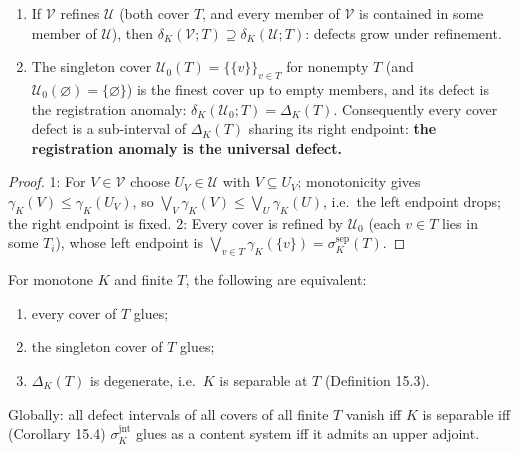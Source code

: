 \begin{thmplain}

\par\nopagebreak

\begin{enumerate}
\def\labelenumi{\arabic{enumi}.}
\tightlist
\item
  If \(\mathcal{V}\) refines \(\mathcal{U}\) (both cover \(T\), and every member of \(\mathcal{V}\) is contained in some member of \(\mathcal{U}\)), then \(\delta_K(\mathcal{V}; T) \supseteq \delta_K(\mathcal{U}; T)\): defects grow under refinement.
\item
  The singleton cover \(\mathcal{U}_0(T) = \{\{v\}\}_{v \in T}\) for nonempty \(T\) (and \(\mathcal{U}_0(\varnothing)=\{\varnothing\}\)) is the finest cover up to empty members, and its defect is the registration anomaly: \(\delta_K(\mathcal{U}_0; T) = \Delta_K(T)\). Consequently every cover defect is a sub-interval of \(\Delta_K(T)\) sharing its right endpoint: \textbf{the registration anomaly is the universal defect.}
\end{enumerate}
\end{thmplain}

\begin{proof}

1: For \(V \in \mathcal{V}\) choose \(U_V \in \mathcal{U}\) with \(V \subseteq U_V\); monotonicity gives \(\gamma_K(V) \le \gamma_K(U_V)\), so \(\bigvee_V \gamma_K(V) \le \bigvee_U \gamma_K(U)\), i.e.~the left endpoint drops; the right endpoint is fixed. 2: Every cover is refined by \(\mathcal{U}_0\) (each \(v \in T\) lies in some \(T_i\)), whose left endpoint is \(\bigvee_{v \in T} \gamma_K(\{v\}) = \sigma^{\mathrm{sep}}_K(T)\).
\end{proof}

\begin{thmplain}

For monotone \(K\) and finite \(T\), the following are equivalent:

\begin{enumerate}
\def\labelenumi{\arabic{enumi}.}
\tightlist
\item
  every cover of \(T\) glues;
\item
  the singleton cover of \(T\) glues;
\item
  \(\Delta_K(T)\) is degenerate, i.e.~\(K\) is separable at \(T\) (Definition 15.3).
\end{enumerate}

Globally: all defect intervals of all covers of all finite \(T\) vanish iff \(K\) is separable iff (Corollary 15.4) \(\sigma^{\mathrm{jnt}}_K\) glues as a content system iff it admits an upper adjoint.
\end{thmplain}

